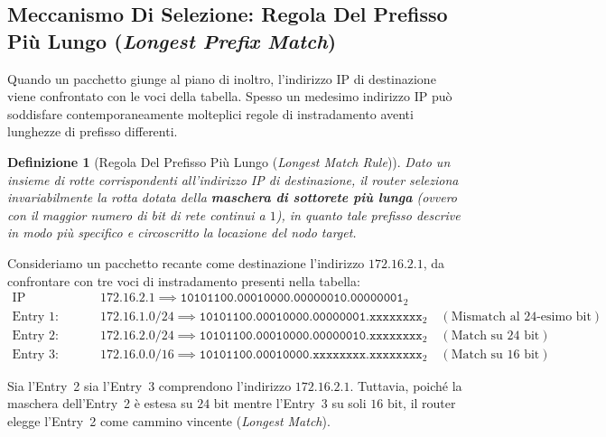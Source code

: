 \documentclass[11pt, a4paper]{article}
\newtheorem{theorem}{Definizione}
\begin{document}
\subsection{Meccanismo Di Selezione: Regola Del Prefisso Più Lungo (\emph{Longest Prefix Match})}

Quando un pacchetto giunge al piano di inoltro, l'indirizzo IP di destinazione viene confrontato con le voci della tabella. Spesso un medesimo indirizzo IP può soddisfare contemporaneamente molteplici regole di instradamento aventi lunghezze di prefisso differenti.

\begin{theorem}[Regola Del Prefisso Più Lungo (\emph{Longest Match Rule})]
Dato un insieme di rotte corrispondenti all'indirizzo IP di destinazione, il router seleziona invariabilmente la rotta dotata della \textbf{maschera di sottorete più lunga} (ovvero con il maggior numero di bit di rete continui a $1$), in quanto tale prefisso descrive in modo più specifico e circoscritto la locazione del nodo target.
\end{theorem}


Consideriamo un pacchetto recante come destinazione l'indirizzo $172.16.2.1$, da confrontare con tre voci di instradamento presenti nella tabella:
\begin{align*}
    \text{IP Destinazione: } & 172.16.2.1 \implies \texttt{10101100.00010000.00000010.00000001}_2 \\
    \text{Entry 1: } & 172.16.1.0/24 \implies \texttt{10101100.00010000.00000001.xxxxxxxx}_2 \quad (\text{Mismatch al 24-esimo bit}) \\
    \text{Entry 2: } & 172.16.2.0/24 \implies \texttt{10101100.00010000.00000010.xxxxxxxx}_2 \quad (\text{Match su 24 bit}) \\
    \text{Entry 3: } & 172.16.0.0/16 \implies \texttt{10101100.00010000.xxxxxxxx.xxxxxxxx}_2 \quad (\text{Match su 16 bit})
\end{align*}

Sia l'Entry~2 sia l'Entry~3 comprendono l'indirizzo $172.16.2.1$. Tuttavia, poiché la maschera dell'Entry~2 è estesa su $24\text{ bit}$ mentre l'Entry~3 su soli $16\text{ bit}$, il router elegge l'Entry~2 come cammino vincente (\emph{Longest Match}).

\end{document}
